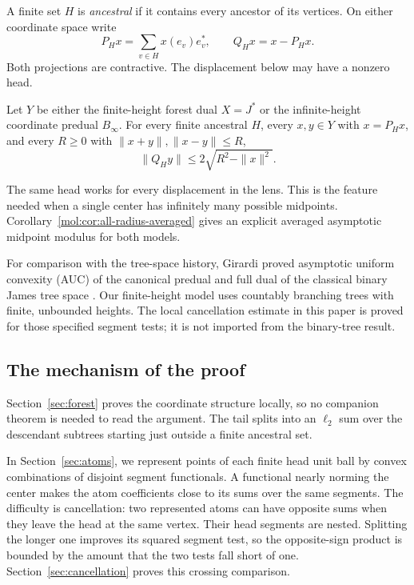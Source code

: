 A finite set $H$ is \emph{ancestral} if it contains every ancestor of
its vertices. On either coordinate space write
\[
 P_Hx=\sum_{v\in H}x(e_v)e_v^*,\qquad Q_Hx=x-P_Hx.
\]
Both projections are contractive. The displacement below may have a
nonzero head.

\begin{theorem}\label{thm:main-tail}\label{mol:prop:joint-budget}
Let $Y$ be either the finite-height forest dual $X=J^*$ or the
infinite-height coordinate predual $B_\infty$. For every finite
ancestral $H$, every $x,y\in Y$ with $x=P_Hx$, and every $R\ge0$
with $\|x+y\|,\|x-y\|\le R$,
\begin{equation}\label{eq:main-squared-tail}
 \|Q_Hy\|\le2\sqrt{R^2-\|x\|^2}.
\end{equation}
\end{theorem}

The same head works for every displacement in the lens. This is the
feature needed when a single center has infinitely many possible
midpoints. Corollary~\ref{mol:cor:all-radius-averaged} gives an
explicit averaged asymptotic midpoint modulus for both models.

For comparison with the tree-space history, Girardi proved asymptotic uniform convexity (AUC) of the
canonical predual and full dual of the classical binary James tree
space \cite[Theorems~3 and~5 of arXiv v1]{Girardi2001}. Our finite-height model uses
countably branching trees with finite, unbounded heights. The local
cancellation estimate in this paper is proved for those specified
segment tests; it is not imported from the binary-tree result.

\subsection{The mechanism of the proof}

Section~\ref{sec:forest} proves the coordinate structure locally, so
no companion theorem is needed to read the argument. The tail splits
into an $\ell_2$ sum over the descendant subtrees starting just outside
a finite ancestral set.

In Section~\ref{sec:atoms}, we represent points of each finite head
unit ball by convex combinations of disjoint segment functionals.
A functional nearly norming the center makes the atom coefficients close
to its sums over the same segments. The difficulty is cancellation:
two represented atoms can have opposite sums when they leave the head
at the same vertex. Their head segments are nested. Splitting the
longer one improves its squared segment test, so the opposite-sign
product is bounded by the amount that the two tests fall short of one.
Section~\ref{sec:cancellation} proves this crossing comparison.

